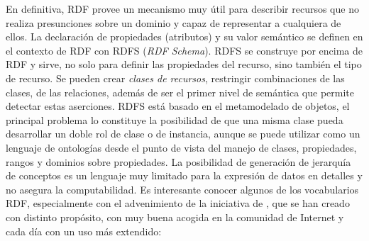 En definitiva, RDF provee un mecanismo muy útil para describir recursos que
no realiza presunciones sobre un dominio y capaz de representar a cualquiera
de ellos. La declaración de propiedades (atributos) y su valor semántico se definen
en el contexto de RDF con RDFS (\textit{\gls{RDF Schema}}). RDFS se construye por
encima de RDF y sirve, no solo para definir las propiedades del recurso, sino también
el tipo de recurso. Se pueden crear \textit{clases de recursos}, restringir
combinaciones de las clases, de las relaciones, además de ser el primer nivel de
semántica que permite detectar estas aserciones. RDFS está basado en el
metamodelado de objetos, el principal problema lo constituye la posibilidad de que una
misma clase pueda desarrollar un doble rol de clase o de instancia, aunque se puede utilizar como
un lenguaje de ontologías desde el punto de vista del manejo de clases, propiedades, rangos y dominios sobre propiedades. 
La posibilidad de generación de jerarquía de conceptos es un lenguaje muy limitado para la expresión de datos en
detalles y no asegura la computabilidad. Es interesante conocer algunos de los vocabularios RDF, especialmente
con el advenimiento de la iniciativa de \linkeddata, que se han creado con distinto propósito, con muy buena 
acogida en la comunidad de Internet y cada día con un uso más extendido: 

